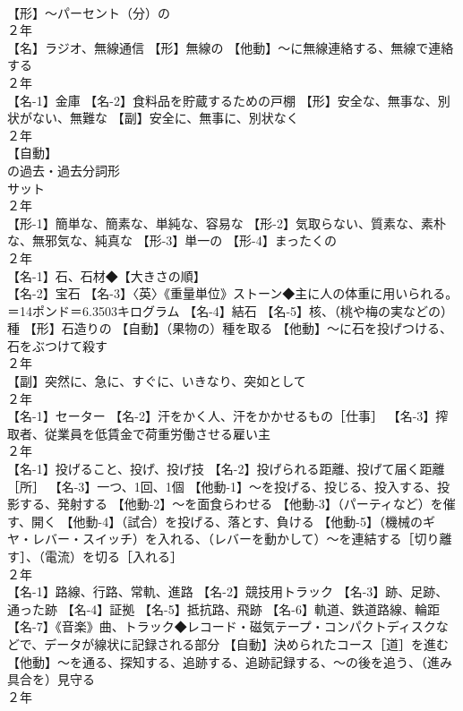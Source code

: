 \documentclass[8pt]{extreport}
\begin{document}
\begin{CJK}{UTF8}{min}
\\	【形】～パーセント（分）の
\\	２年	
\\	【名】ラジオ、無線通信 【形】無線の 【他動】～に無線連絡する、無線で連絡する
\\	２年	
\\	【名-1】金庫 【名-2】食料品を貯蔵するための戸棚 【形】安全な、無事な、別状がない、無難な 【副】安全に、無事に、別状なく
\\	２年	
\\	【自動】
\\	の過去・過去分詞形 
\\	サット
\\	２年	
\\	【形-1】簡単な、簡素な、単純な、容易な 【形-2】気取らない、質素な、素朴な、無邪気な、純真な 【形-3】単一の 【形-4】まったくの
\\	２年	
\\	【名-1】石、石材◆【大きさの順】
\\	【名-2】宝石 【名-3】〈英〉《重量単位》ストーン◆主に人の体重に用いられる。＝14ポンド＝6.3503キログラム 【名-4】結石 【名-5】核、（桃や梅の実などの）種 【形】石造りの 【自動】（果物の）種を取る 【他動】～に石を投げつける、石をぶつけて殺す
\\	２年	
\\	【副】突然に、急に、すぐに、いきなり、突如として
\\	２年	
\\	【名-1】セーター 【名-2】汗をかく人、汗をかかせるもの［仕事］ 【名-3】搾取者、従業員を低賃金で荷重労働させる雇い主
\\	２年	
\\	【名-1】投げること、投げ、投げ技 【名-2】投げられる距離、投げて届く距離［所］ 【名-3】一つ、1回、1個 【他動-1】～を投げる、投じる、投入する、投影する、発射する 【他動-2】～を面食らわせる 【他動-3】（パーティなど）を催す、開く 【他動-4】（試合）を投げる、落とす、負ける 【他動-5】（機械のギヤ・レバー・スイッチ）を入れる、（レバーを動かして）～を連結する［切り離す］、（電流）を切る［入れる］
\\	２年	
\\	【名-1】路線、行路、常軌、進路 【名-2】競技用トラック 【名-3】跡、足跡、通った跡 【名-4】証拠 【名-5】抵抗路、飛跡 【名-6】軌道、鉄道路線、輪距 【名-7】《音楽》曲、トラック◆レコード・磁気テープ・コンパクトディスクなどで、データが線状に記録される部分 【自動】決められたコース［道］を進む 【他動】～を通る、探知する、追跡する、追跡記録する、～の後を追う、（進み具合を）見守る
\\	２年	

\end{CJK}
\end{document}

